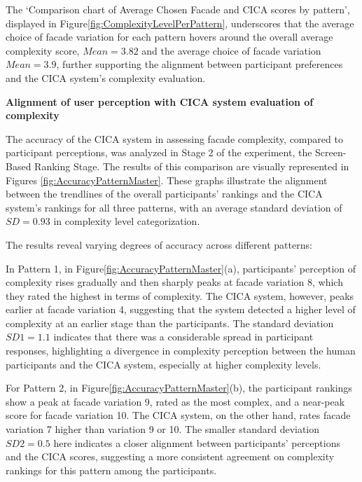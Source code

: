
The `Comparison chart of Average Chosen Facade and CICA scores by pattern', displayed in Figure\ref{fig:ComplexityLevelPerPattern}, underscores that the average choice of facade variation for each pattern hovers around the overall average complexity score, \(Mean = 3.82\) and the average choice of facade variation \(Mean = 3.9\), further supporting the alignment between participant preferences and the CICA system's complexity evaluation.

\textbf{Alignment of user perception with CICA system evaluation of complexity}

The accuracy of the CICA system in assessing facade complexity, compared to participant perceptions, was analyzed in Stage 2 of the experiment, the Screen-Based Ranking Stage.
The results of this comparison are visually represented in Figures \ref{fig:AccuracyPatternMaster}.
These graphs illustrate the alignment between the trendlines of the overall participants' rankings and the CICA system's rankings for all three patterns, with an average standard deviation of \(SD = 0.93\) in complexity level categorization.

The results reveal varying degrees of accuracy across different patterns:

In Pattern 1, in Figure\ref{fig:AccuracyPatternMaster}(a), participants' perception of complexity rises gradually and then sharply peaks at facade variation 8, which they rated the highest in terms of complexity.
The CICA system, however, peaks earlier at facade variation 4, suggesting that the system detected a higher level of complexity at an earlier stage than the participants.
The standard deviation \(SD1 = 1.1\) indicates that there was a considerable spread in participant responses, highlighting a divergence in complexity perception between the human participants and the CICA system, especially at higher complexity levels.

For Pattern 2, in Figure\ref{fig:AccuracyPatternMaster}(b), the participant rankings show a peak at facade variation 9, rated as the most complex, and a near-peak score for facade variation 10.
The CICA system, on the other hand, rates facade variation 7 higher than variation 9 or 10.
The smaller standard deviation \(SD2 = 0.5\) here indicates a closer alignment between participants’ perceptions and the CICA scores, suggesting a more consistent agreement on complexity rankings for this pattern among the participants.

